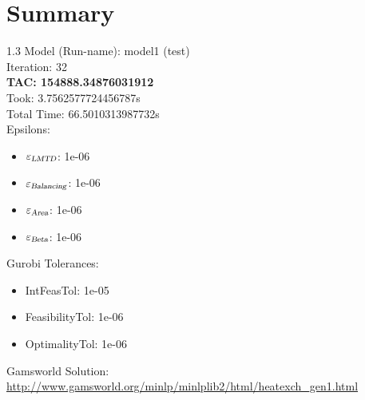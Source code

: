 \documentclass{article}%
\begin{document}
%
\normalsize%
\section{Summary}%
\thispagestyle{plain}%
\begin{spacing}{1.3}%
\Large%
Model (Run-name): model1 (test)\\%
Iteration: 32\\%
\textbf{TAC: 154888.34876031912}\\%
Took: 3.7562577724456787s\\%
Total Time: 66.5010313987732s\\%
Epsilons:%
\begin{itemize}%
	\item $\varepsilon_{\textsl{LMTD}}$: 1e-06%
	\item $\varepsilon_{\textsl{Balancing}}$: 1e-06%
	\item $\varepsilon_{\textsl{Area}}$: 1e-06%
	\item $\varepsilon_{\textsl{Beta}}$: 1e-06%
\end{itemize}%
Gurobi Tolerances:%
\begin{itemize}%
	\item IntFeasTol: 1e-05%
	\item FeasibilityTol: 1e-06%
	\item OptimalityTol: 1e-06%
\end{itemize}%
\end{spacing}%
\normalsize%
Gamsworld Solution: \url{http://www.gamsworld.org/minlp/minlplib2/html/heatexch_gen1.html}%
%
\clearpage%
\end{document}
